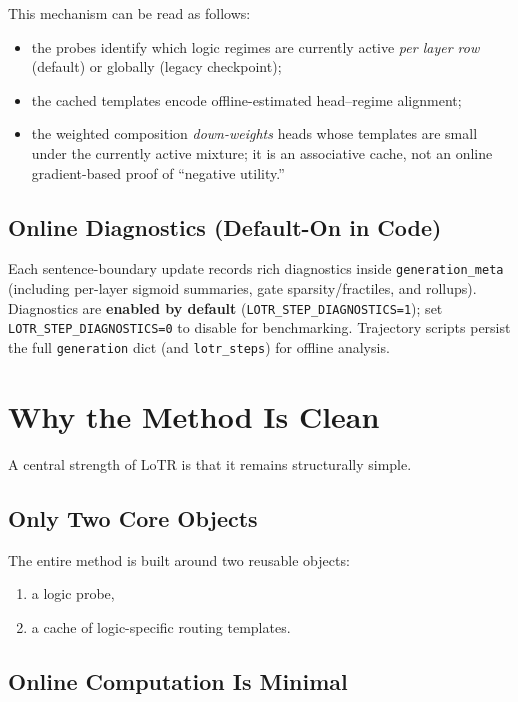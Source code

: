\documentclass[11pt]{article}
\begin{document}
This mechanism can be read as follows:
\begin{itemize}[leftmargin=1.5em]
    \item the probes identify which logic regimes are currently active \emph{per layer row} (default) or globally (legacy checkpoint);
    \item the cached templates encode offline-estimated head--regime alignment;
    \item the weighted composition \emph{down-weights} heads whose templates are small under the currently active mixture; it is an associative cache, not an online gradient-based proof of ``negative utility.''
\end{itemize}

\subsection{Online Diagnostics (Default-On in Code)}

Each sentence-boundary update records rich diagnostics inside \texttt{generation\_meta} (including per-layer sigmoid summaries, gate sparsity/fractiles, and rollups). Diagnostics are \textbf{enabled by default} (\texttt{LOTR\_STEP\_DIAGNOSTICS=1}); set \texttt{LOTR\_STEP\_DIAGNOSTICS=0} to disable for benchmarking. Trajectory scripts persist the full \texttt{generation} dict (and \texttt{lotr\_steps}) for offline analysis.

\section{Why the Method Is Clean}

A central strength of LoTR is that it remains structurally simple.

\subsection{Only Two Core Objects}

The entire method is built around two reusable objects:
\begin{enumerate}[leftmargin=1.5em]
    \item a logic probe,
    \item a cache of logic-specific routing templates.
\end{enumerate}

\subsection{Online Computation Is Minimal}
\end{document}
